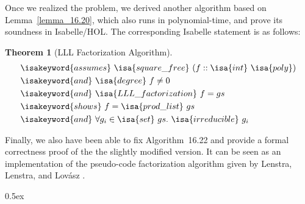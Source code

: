 \documentclass[11pt,a4paper]{article}
\newcommand\tint{\isa{int}}
\newcommand\tpoly{\isa{poly}}
\newcommand\sqfree{\isa{square\_free}\xspace}
\newcommand\assumes{\isakeyword{assumes}\xspace}
\newcommand\idegree{\isa{degree}}
\newcommand\iand{\isakeyword{and}\xspace}
\newcommand\shows{\isakeyword{shows}}
\newcommand\listprod{\isa{prod\_list}}
\newcommand\set{\isa{set}}
\newcommand\irred{\isa{irreducible}}
\newtheorem{theorem}{Theorem}
\begin{document}
Once we realized the problem, we derived another algorithm based on Lemma~\ref{lemma_16.20}, 
which also runs in polynomial-time, and prove its soundness in Isabelle/HOL. 
The corresponding Isabelle statement is as follows:

\begin{theorem}[LLL Factorization Algorithm]
\label{thm:LLL_factorization}
\begin{align*}
& \assumes\ \sqfree\ (f :: \tint\ \tpoly) \\
& \iand\ \idegree\ f \neq 0 \\
& \iand\  \isa{LLL\_factorization}\ f = gs \\
& \shows\ f = \listprod\ gs\ \\
& \iand\ \forall g_i \in \set\ gs.\ \irred\ g_i
\end{align*}
\end{theorem}

Finally, we also have been able to fix Algorithm~16.22 and 
provide a formal correctness proof of the the slightly modified version. 
It can be seen as an implementation of the pseudo-code factorization algorithm
given by Lenstra, Lenstra, and Lov{\'a}sz \cite{LLL}.

\parindent 0pt\parskip 0.5ex





\end{document}
